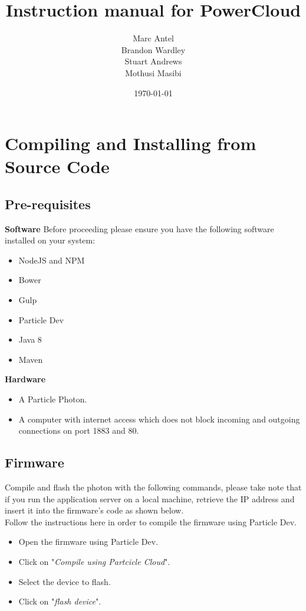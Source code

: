 \documentclass[a4paper,10pt]{article}
\title{Instruction manual for PowerCloud}
\author{Marc Antel\\ Brandon Wardley\\ Stuart Andrews\\ Mothusi Masibi}
\date{\today}
\begin{document}
		\maketitle
		\newpage
	\section{Compiling and Installing from Source Code}
		\subsection{Pre-requisites}
			\textbf{Software}
			Before proceeding please ensure you have the following software installed on your system:
			\begin{itemize}
				\item NodeJS and NPM
				\item Bower
				\item Gulp
				\item Particle Dev
				\item Java 8
				\item Maven
			\end{itemize}
			
			\textbf{Hardware}
			\begin{itemize}
				\item A Particle Photon.
				\item A computer with internet access which does not block incoming and outgoing connections on port 1883 and 80.
			\end{itemize}
			
		\subsection{Firmware}
			Compile and flash the photon with the following commands, please take note that if you run the application server on a local machine, retrieve the IP address and insert it into the firmware's code as shown below.\\

			Follow the instructions here in order to compile the firmware using Particle Dev.
			\\
			\begin{itemize}
				\item Open the firmware using Particle Dev.
				\item Click on "\textit{Compile using Partcicle Cloud}".
				\item Select the device to flash.
				\item Click on "\textit{flash device}".
			\end{itemize}
			
\end{document}
